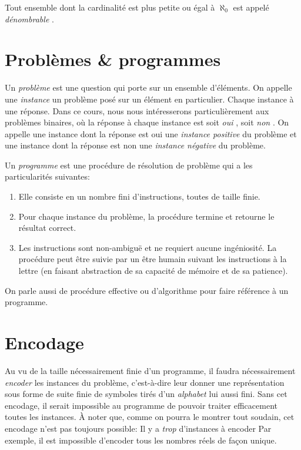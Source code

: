 Tout ensemble dont la cardinalité est plus petite ou égal à $\aleph_0$ est appelé \og \textit{dénombrable} \fg{}.

\section{Problèmes \& programmes}

Un \og \textit{problème} \fg{} est une question qui porte sur un ensemble d'éléments.
On appelle une \og \textit{instance} \fg{} un problème posé sur un élément en particulier.
Chaque instance à une réponse.
Dans ce cours, nous nous intéresserons particulièrement aux problèmes binaires, où la réponse à chaque instance est soit \og \textit{oui} \fg{}, soit \og \textit{non} \fg{}.
On appelle une instance dont la réponse est \og oui \fg{} une \og \textit{instance positive} \fg{} du problème et une instance dont la réponse est \og non \fg{} une \og \textit{instance négative} \fg{} du problème.

Un \og \textit{programme} \fg{} est une procédure de résolution de problème qui a les particularités suivantes:
\begin{enumerate}
\item
Elle consiste en un nombre fini d'instructions, toutes de taille finie.
\item
Pour chaque instance du problème, la procédure termine et retourne le résultat correct.
\item
Les instructions sont non-ambiguë et ne requiert aucune ingéniosité. La procédure peut être suivie par un être humain suivant les instructions à la lettre (en faisant abstraction de sa capacité de mémoire et de sa patience). 
\end{enumerate}
On parle aussi de \og procédure effective \fg{} ou d'\og algorithme \fg{} pour faire référence à un programme.

\section{Encodage}

Au vu de la taille nécessairement finie d'un programme, il faudra nécessairement \textit{encoder} les instances du problème, c'est-à-dire leur donner une représentation sous forme de suite finie de symboles tirés d'un \og \textit{alphabet} \fg{} lui aussi fini.
Sans cet encodage, il serait impossible au programme de pouvoir traiter efficacement toutes les instances.
À noter que, comme on pourra le montrer tout soudain, cet encodage n'est pas toujours possible:
Il y a \textit{trop} d'instances à encoder
Par exemple, il est impossible d'encoder tous les nombres réels de façon unique.

